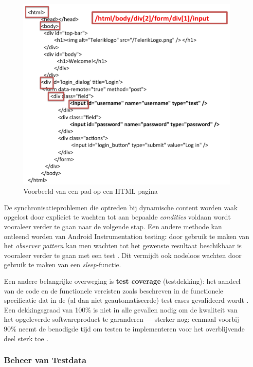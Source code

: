 \begin{figure}[h!]
    \centering
    \includegraphics[scale=0.5]{img/Holmes2020XPath.PNG}
    \caption{Voorbeeld van een pad op een HTML-pagina \autocite{Holmes2020}}
    \label{fig:holmesxpath}
\end{figure}

De synchronisatieproblemen die optreden bij dynamische content worden vaak opgelost door expliciet te wachten tot aan bepaalde \emph{condities} voldaan wordt vooraleer verder te gaan naar de volgende stap. Een andere methode kan ontleend worden van Android Instrumentation testing: door gebruik te maken van het \emph{observer pattern} kan men wachten tot het gewenste resultaat beschikbaar is vooraleer verder te gaan met een test \autocite{Elye2018}. Dit vermijdt ook nodeloos wachten door gebruik te maken van een \emph{sleep}-functie.

Een andere belangrijke overweging is \textbf{test coverage} (testdekking): het aandeel van de code en de functionele vereisten zoals beschreven in de functionele specificatie dat in de (al dan niet geautomatiseerde) test cases gevalideerd wordt \autocite{Sheth2019}. Een dekkingsgraad van 100\% is niet in alle gevallen nodig om de kwaliteit van het opgeleverde softwareproduct te garanderen — sterker nog: eenmaal voorbij 90\% neemt de benodigde tijd om testen te implementeren voor het overblijvende deel sterk toe \autocite{Prause2017}.

\subsubsection{Beheer van Testdata}

